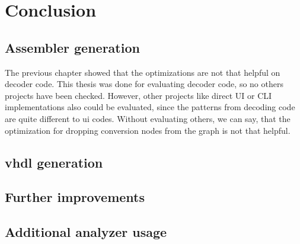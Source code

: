 \chapter{Conclusion}\label{sec:conclusion}

\section{Assembler generation}
The previous chapter showed that the optimizations are not that helpful on decoder code. This thesis was done for evaluating decoder code, so no others projects have been checked. However, other projects like direct UI or CLI implementations also could be evaluated, since the patterns from decoding code are quite different to ui codes. Without evaluating others, we can say, that the optimization for dropping conversion nodes from the graph is not that helpful.

\section{vhdl generation}

\section{Further improvements}

\section{Additional analyzer usage}
